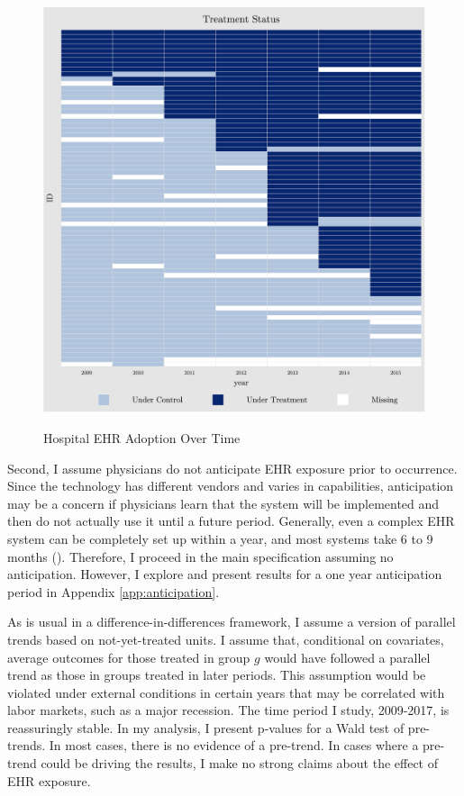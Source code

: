 \documentclass[11pt]{article}
\begin{document}
\begin{figure}[ht]
    \centering
    \caption{Hospital EHR Adoption Over Time}
    \includegraphics[scale=.7]{Objects/hosp_treat.pdf}
    \label{fig:hosp_treat}
\end{figure}

Second, I assume physicians do not anticipate EHR exposure prior to occurrence. Since the technology has different vendors and varies in capabilities, anticipation may be a concern if physicians learn that the system will be implemented and then do not actually use it until a future period. Generally, even a complex EHR system can be completely set up within a year, and most systems take 6 to 9 months (\cite{uzialko_2021}). Therefore, I proceed in the main specification assuming no anticipation. However, I explore and present results for a one year anticipation period in Appendix \ref{app:anticipation}. 

As is usual in a difference-in-differences framework, I assume a version of parallel trends based on not-yet-treated units. I assume that, conditional on covariates, average outcomes for those treated in group $g$ would have followed a parallel trend as those in groups treated in later periods. This assumption would be violated under external conditions in certain years that may be correlated with labor markets, such as a major recession. The time period I study, 2009-2017, is reassuringly stable. In my analysis, I present p-values for a Wald test of pre-trends. In most cases, there is no evidence of a pre-trend. In cases where a pre-trend could be driving the results, I make no strong claims about the effect of EHR exposure. 
\end{document}
